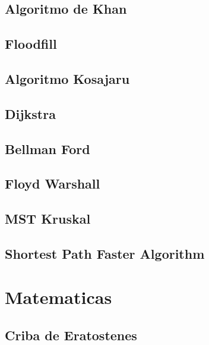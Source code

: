 \subsection{Algoritmo de Khan}
\raggedbottom
\hrulefill
\subsection{Floodfill}
\raggedbottom
\hrulefill
\subsection{Algoritmo Kosajaru}
\raggedbottom
\hrulefill
\subsection{Dijkstra}
\raggedbottom
\hrulefill
\subsection{Bellman Ford}
\raggedbottom
\hrulefill
\subsection{Floyd Warshall}
\raggedbottom
\hrulefill
\subsection{MST Kruskal}
\raggedbottom
\hrulefill
\subsection{Shortest Path Faster Algorithm}
\raggedbottom
\hrulefill

\section{Matematicas}
\subsection{Criba de Eratostenes}
\raggedbottom
\hrulefill
